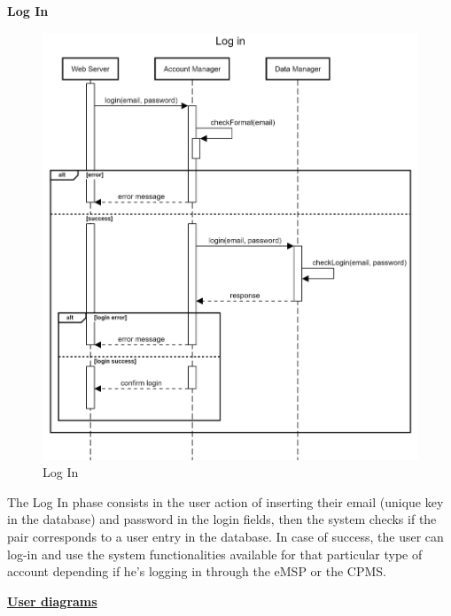 \documentclass[table, 12pt]{article}
\begin{document}
\textbf{Log In}
\begin{center}
    \begin{figure}[H]
        \includegraphics[scale=0.2, center]{assets/sequenceDiagrams/shared login.png}
        \caption{Log In}
        \label{fig: login}
    \end{figure}
\end{center}

The Log In phase consists in the user action of inserting their email (unique key in the database) and password in the login fields, then the system checks if the pair corresponds to a user entry in the database.
In case of success, the user can log-in and use the system functionalities available for that particular type of account depending if he's logging in through the eMSP or the CPMS.

\newpage
\underline{\textbf{User diagrams}}\\
\end{document}
